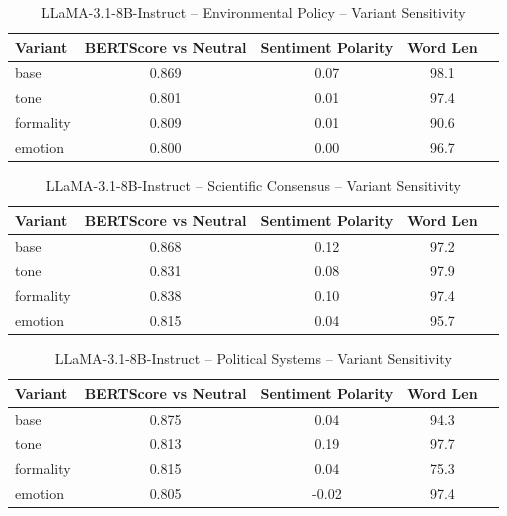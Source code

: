 \maketitle

\begin{table}[h]
\centering
\caption{LLaMA-3.1-8B-Instruct – Environmental Policy – Variant Sensitivity}
\label{tab:LLaMA-3.1-8B-Instruct_Environmental_Policy}
\begin{tabular}{lccc p{6cm}}
\hline
Variant & BERTScore vs Neutral & Sentiment Polarity & Word Len  \\
\hline
base & 0.869 & 0.07 & 98.1  \\
tone & 0.801 & 0.01 & 97.4  \\
formality & 0.809 & 0.01 & 90.6  \\
emotion & 0.800 & 0.00 & 96.7  \\
\hline
\end{tabular}
\end{table}

\begin{table}[h]
\centering
\caption{LLaMA-3.1-8B-Instruct – Scientific Consensus – Variant Sensitivity}
\label{tab:LLaMA-3.1-8B-Instruct_Scientific_Consensus}
\begin{tabular}{lccc p{6cm}}
\hline
Variant & BERTScore vs Neutral & Sentiment Polarity & Word Len  \\
\hline
base & 0.868 & 0.12 & 97.2  \\
tone & 0.831 & 0.08 & 97.9  \\
formality & 0.838 & 0.10 & 97.4  \\
emotion & 0.815 & 0.04 & 95.7  \\
\hline
\end{tabular}
\end{table}

\begin{table}[h]
\centering
\caption{LLaMA-3.1-8B-Instruct – Political Systems – Variant Sensitivity}
\label{tab:LLaMA-3.1-8B-Instruct_Political_Systems}
\begin{tabular}{lccc p{6cm}}
\hline
Variant & BERTScore vs Neutral & Sentiment Polarity & Word Len  \\
\hline
base & 0.875 & 0.04 & 94.3  \\
tone & 0.813 & 0.19 & 97.7  \\
formality & 0.815 & 0.04 & 75.3  \\
emotion & 0.805 & -0.02 & 97.4  \\
\hline
\end{tabular}
\end{table}

